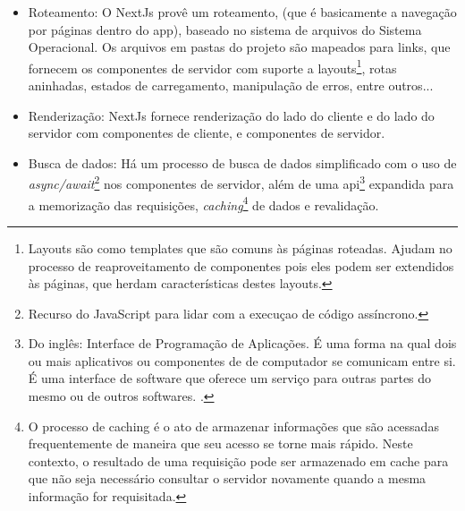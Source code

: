 \begin{itemize}
        
	\item Roteamento: O NextJs provê um roteamento, (que é basicamente a navegação por páginas
                    dentro do app), baseado no sistema de arquivos do Sistema Operacional. Os arquivos
                    em pastas do projeto são mapeados para links, que fornecem os componentes de servidor
                    com suporte a
                    layouts\footnote{Layouts são como templates que são comuns às páginas roteadas. Ajudam no processo
                        de reaproveitamento de componentes pois eles podem ser extendidos às páginas,
                        que herdam características destes layouts.
                    },
                    rotas aninhadas, estados de carregamento, manipulação de erros,
                    entre outros...
                
	\item Renderização: NextJs fornece renderização do lado do cliente e do lado do servidor com
                    componentes de cliente, e componentes de servidor.
                
	\item Busca de dados: Há um processo de busca de dados simplificado com o uso de
                    \textit{async/await}\footnote{Recurso do JavaScript para lidar com a execuçao de código assíncrono.
                    }
                    nos componentes de servidor, além de uma
                    \acrshort{api}\footnote{Do inglês: Interface de Programação de Aplicações. É uma forma na qual
                        dois ou mais aplicativos ou componentes de de computador se comunicam
                        entre si. É uma interface de software que oferece um serviço para outras
                        partes do mesmo ou de outros softwares.
                        \cite{api-reddy}.
                    }
                    expandida para a memorização das
                    requisições,
                    \textit{caching}\footnote{O processo de caching é o ato de armazenar informações que são acessadas
                        frequentemente de maneira que seu acesso se torne mais rápido. Neste contexto,
                        o resultado de uma requisição pode ser armazenado em cache para que não
                        seja necessário consultar o servidor novamente quando a mesma informação
                        for requisitada.
                    }
                    de dados e revalidação.
                

\end{itemize}
